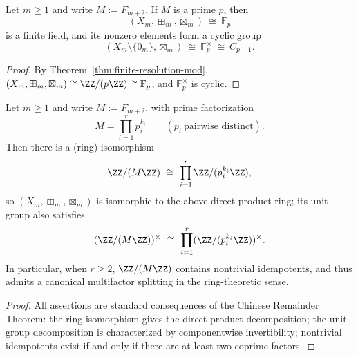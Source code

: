 \begin{corollary}\label{cor:field-phase-fib-prime}
Let $m\ge 1$ and write $M:=F_{m+2}$. If $M$ is a prime $p$, then
\[
(X_m,\boxplus_m,\boxtimes_m)\ \cong\ \mathbb{F}_p
\]
is a finite field, and its nonzero elements form a cyclic group
\[
(X_m\setminus\{0_m\},\boxtimes_m)\ \cong\ \mathbb{F}_p^\times\ \cong\ C_{p-1}.
\]
\end{corollary}
\begin{proof}
By Theorem~\ref{thm:finite-resolution-mod}, $(X_m,\boxplus_m,\boxtimes_m)\cong \ZZ/(p\ZZ)\cong \mathbb{F}_p$, and \(\mathbb{F}_p^\times\) is cyclic.
\end{proof}

\begin{corollary}\label{cor:crt-factorization}
Let $m\ge 1$ and write $M:=F_{m+2}$, with prime factorization
\[
M=\prod_{i=1}^{r} p_i^{k_i}\qquad(p_i\ \text{pairwise distinct}).
\]
Then there is a (ring) isomorphism
\[
\ZZ/(M\ZZ)\ \cong\ \prod_{i=1}^{r}\ZZ/(p_i^{k_i}\ZZ),
\]
so $(X_m,\boxplus_m,\boxtimes_m)$ is isomorphic to the above direct-product ring; its unit group also satisfies
\[
(\ZZ/(M\ZZ))^\times\ \cong\ \prod_{i=1}^{r}(\ZZ/(p_i^{k_i}\ZZ))^\times.
\]
In particular, when $r\ge 2$, $\ZZ/(M\ZZ)$ contains nontrivial idempotents, and thus admits a canonical multifactor splitting in the ring-theoretic sense.
\end{corollary}
\begin{proof}
All assertions are standard consequences of the Chinese Remainder Theorem: the ring isomorphism gives the direct-product decomposition; the unit group decomposition is characterized by componentwise invertibility; nontrivial idempotents exist if and only if there are at least two coprime factors.
\end{proof}

